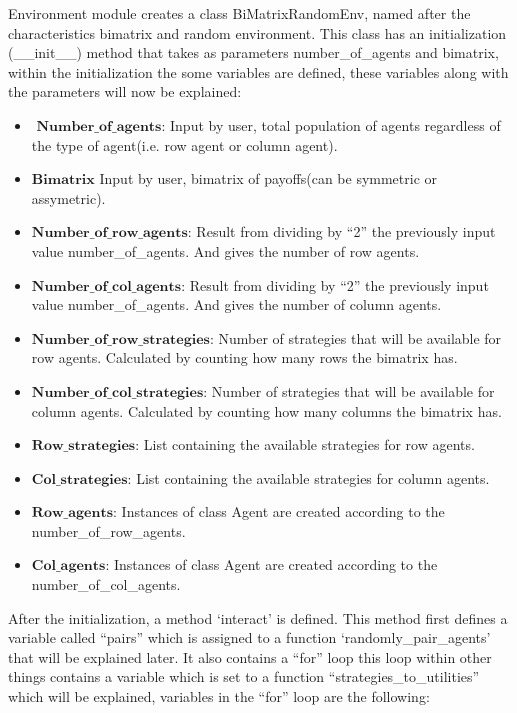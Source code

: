 \documentclass{article}
\begin{document}
Environment module creates a class BiMatrixRandomEnv, named after the characteristics bimatrix and random environment. This class has an initialization (\_\_init\_\_) method that takes as parameters number\_of\_agents and bimatrix, within the initialization the some variables are defined, these variables along with the parameters will now be explained:

\begin{itemize}
\item $\textbf{ Number\_of\_agents:}$ Input by user, total population of agents regardless of the type of agent(i.e. row agent or column agent).
\item $\textbf{Bimatrix}$ Input by user, bimatrix of payoffs(can be symmetric or assymetric).
\item $\textbf{Number\_of\_row\_agents:}$ Result from dividing by “2” the previously input value number\_of\_agents. And gives the number of row agents.
\item $\textbf{Number\_of\_col\_agents:}$ Result from dividing by “2” the previously input value number\_of\_agents. And gives the number of column agents.
\item $\textbf{Number\_of\_row\_strategies:}$ Number of strategies that will be available for row agents. Calculated by counting how many rows the bimatrix has.
\item $\textbf{Number\_of\_col\_strategies:}$ Number of strategies that will be available for column agents. Calculated by counting how many columns the bimatrix has.
\item $\textbf{Row\_strategies:}$ List containing the available strategies for row agents.
\item $\textbf{Col\_strategies:}$ List containing the available strategies for column agents.
\item $\textbf{Row\_agents:}$ Instances of class Agent are created according to the number\_of\_row\_agents. 
\item $\textbf{Col\_agents:}$ Instances of class Agent are created according to the number\_of\_col\_agents.
\end{itemize}

After the initialization, a method `interact’ is defined. This method first defines a variable called ``pairs'' which is assigned to a function `randomly\_pair\_agents’ that will be explained later. It also contains a ``for'' loop this loop within other things contains a variable which is set to a function ``strategies\_to\_utilities'' which will be explained, variables in the ``for'' loop are the following:
\end{document}
